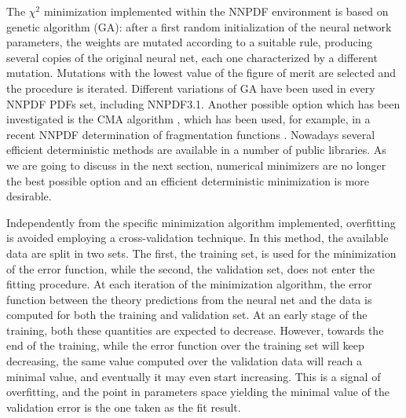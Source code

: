 %
The $\chi^2$ minimization implemented within the NNPDF environment is based on genetic algorithm (GA):
after a first random initialization of the neural network parameters,
the weights are mutated according to a suitable rule, producing
several copies of the original neural net, each one characterized by a different mutation.
Mutations with the lowest value of the figure of merit are selected and the procedure is iterated.
Different variations of GA have been used in every NNPDF PDFs set, including NNPDF3.1.
Another possible option which has been investigated is the CMA algorithm \cite{DBLP:journals/corr/Hansen16a},
which has been used, for example, in a recent NNPDF determination of 
fragmentation functions \cite{Bertone:2017tyb}. 
Nowadays several efficient deterministic methods are available in a number of public libraries.
As we are going to discuss in the next section, numerical minimizers are no longer the best possible option
and an efficient deterministic minimization is more desirable. 

%
Independently from the specific minimization algorithm implemented, overfitting is avoided
employing a cross-validation technique. In this method, the available data are split
in two sets. The first, the training set, is used for the minimization of the error function,
while the second, the validation set, does not enter the fitting procedure. At each iteration of
the minimization algorithm, the error function between the theory predictions from the neural
net and the data is computed for both the training and validation set. At an early stage of
the training, both these quantities are expected to decrease. However, towards the end of the
training, while the error function over the training set will keep decreasing, the same value
computed over the validation data will reach a minimal value, and eventually it may even start
increasing. This is a signal of overfitting, and the point in parameters space yielding the minimal
value of the validation error is the one taken as the fit result.  

